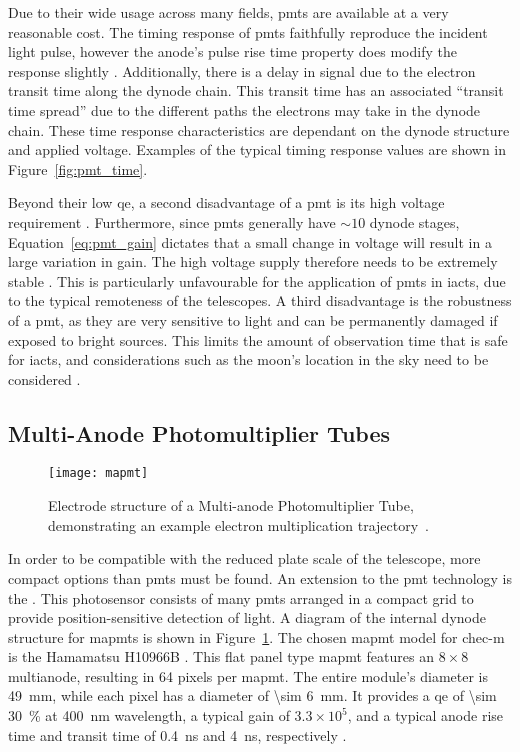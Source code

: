 Due to their wide usage across many fields, \glspl{pmt} are available at a very reasonable cost. The timing response of \glspl{pmt} faithfully reproduce the incident light pulse, however the anode's pulse rise time property does modify the response slightly \cite{Hamamatsu2016}. Additionally, there is a delay in signal due to the electron transit time along the dynode chain. This transit time has an associated ``transit time spread'' due to the different paths the electrons may take in the dynode chain. These time response characteristics are dependant on the dynode structure and applied voltage. Examples of the typical timing response values are shown in Figure~\ref{fig:pmt_time}.

Beyond their low \gls{qe}, a second disadvantage of a \gls{pmt} is its high voltage requirement \cite{Weekes2003}. Furthermore, since \glspl{pmt} generally have $\sim 10$ dynode stages, Equation~\ref{eq:pmt_gain} dictates that a small change in voltage will result in a large variation in gain. The high voltage supply therefore needs to be extremely stable \cite{Hamamatsu2016}. This is particularly unfavourable for the application of \glspl{pmt} in \glspl{iact}, due to the typical remoteness of the telescopes. A third disadvantage is the robustness of a \gls{pmt}, as they are very sensitive to light and can be permanently damaged if exposed to bright sources. This limits the amount of observation time that is safe for \glspl{iact}, and considerations such as the moon's location in the sky need to be considered \cite{Knoetig2013}.

\subsection{Multi-Anode Photomultiplier Tubes}

\begin{figure}
	\centering
    \texttt{[image: mapmt]} 
	\caption[Internals of a Multi-anode Photomultiplier Tube.]{Electrode structure of a Multi-anode Photomultiplier Tube, demonstrating an example electron multiplication trajectory~\cite{HAMAMATSU2007}.}
	\label{fig:mapmt}
\end{figure}

In order to be compatible with the reduced plate scale of the telescope, more compact options than \glspl{pmt} must be found. An extension to the \gls{pmt} technology is the . This photosensor consists of many \glspl{pmt} arranged in a compact grid to provide position-sensitive detection of light. A diagram of the internal dynode structure for \glspl{mapmt} is shown in Figure~\ref{fig:mapmt}. The chosen \gls{mapmt} model for \gls{chec-m} is the Hamamatsu H10966B . This flat panel type \gls{mapmt} features an $8 \times 8$ multianode, resulting in 64 pixels per \gls{mapmt}. The entire module's diameter is \SI{49}{mm}, while each pixel has a diameter of \SI{\sim 6}{mm}. It provides a \gls{qe} of \SI{\sim 30}{\percent} at \SI{400}{nm} wavelength, a typical gain of $3.3 \times 10^5$, and a typical anode rise time and transit time of \SI{0.4}{ns} and \SI{4}{ns}, respectively \cite{Hamamatsu2011}. 


